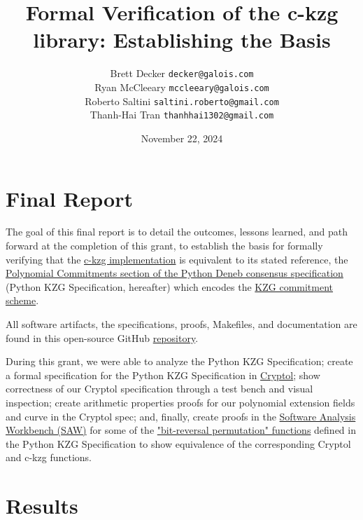 \documentclass[12pt]{galois-whitepaper}
\author{Brett Decker \texttt{decker@galois.com}\\
Ryan McCleeary \texttt{mccleeary@galois.com}\\
Roberto Saltini \texttt{saltini.roberto@gmail.com}\\
Thanh-Hai Tran \texttt{thanhhai1302@gmail.com}
}
\title{Formal Verification of the c-kzg library: Establishing the Basis}
\date{November 22, 2024}
\begin{document}
\maketitle

\vspace*{2cm}

\newpage
\tableofcontents
\newpage

\section{Final Report}
The goal of this final report is to detail the outcomes, lessons learned, and path forward at the completion of this grant, to establish the basis for formally verifying that
the \href{https://github.com/ethereum/c-kzg-4844}{c-kzg implementation} is equivalent to its stated reference,
the \href{https://github.com/ethereum/consensus-specs/blob/68d32accf945a84f69d4c779cb6c71223a311eac/specs/deneb/polynomial-commitments.md}{Polynomial Commitments section of the Python Deneb consensus specification} (Python KZG Specification, hereafter) which encodes the \href{https://www.iacr.org/archive/asiacrypt2010/6477178/6477178.pdf}{KZG commitment scheme}.

All software artifacts, the specifications, proofs, Makefiles, and documentation are found in this open-source GitHub \href{https://github.com/GaloisInc/ckzg-eip-4844-verification}{repository}.

During this grant, we were able to analyze the Python KZG Specification; create a formal specification
for the Python KZG Specification in \href{https://cryptol.net}{Cryptol}; show correctness of our Cryptol
specification through a test bench and visual inspection; create arithmetic properties proofs for our polynomial extension fields and curve in the Cryptol spec; and, finally, create proofs in
the \href{https://saw.galois.com}{Software Analysis Workbench (SAW)} for some of the
\href{https://github.com/ethereum/consensus-specs/blob/68d32accf945a84f69d4c779cb6c71223a311eac/specs/deneb/polynomial-commitments.md\#bit-reversal-permutation}
{"bit-reversal permutation" functions} defined in the Python KZG Specification to show equivalence of
the corresponding Cryptol and c-kzg functions.

\section{Results}
\end{document}
